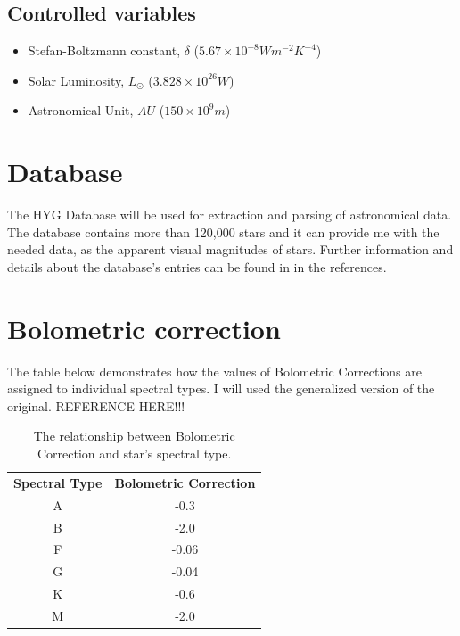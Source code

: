 \documentclass[a4paper,12pt]{article}
\begin{document}
  
  \subsection{Controlled variables}

  \begin{itemize}

    \item Stefan-Boltzmann constant, $\delta$ ($5.67 \times 10^{-8} W m^{-2} K^{-4}$)

    \item Solar Luminosity, $L_{\odot}$ ($3.828 \times 10^{26}W$)

    \item Astronomical Unit, $AU$ ($150 \times 10^{9}m$)
      
\end{itemize}
  

  \doublespacing
\newpage
  \section{Database}
  \label{database}
  The HYG Database \cite{hyg} will be used for extraction and parsing of astronomical data. The database contains more than 120,000 stars and it can provide me with the needed data, as the apparent visual magnitudes of stars. Further information and details about the database's entries can be found in in the references. 


\section{Bolometric correction}

The table below demonstrates how the values of Bolometric Corrections are assigned to individual spectral types. I will used the generalized version of the original. REFERENCE HERE!!!\\


  \begin{table}[h!]
    \begin{center}
      \centering
    \caption{The relationship between Bolometric Correction and star's spectral type.}
    \begin{tabular}{c | c}
      \textbf{Spectral Type} & \textbf{Bolometric Correction} \\
      A & -0.3\\
      B & -2.0\\
      F & -0.06\\
      G & -0.04\\
      K & -0.6\\
      M & -2.0\\
    \end{tabular}
    \label{stars}
  \end{center}
    \end{table}
\end{document}
